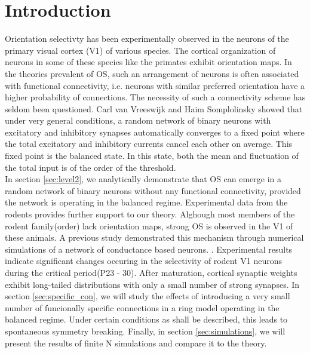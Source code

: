 \section{\label{sec:level1}Introduction}
Orientation selectivty has been experimentally observed in the neurons of the primary visual cortex (V1) of various species. The cortical organization of neurons in some of these species like the primates exhibit orientation maps. In the theories prevalent of OS, such an arrangement of neurons is often associated with functional connectivity, i.e. neurons with similar preferred orientation have a higher probability of connections. The necessity of such a connectivity scheme has seldom been questioned\@. 
Carl van Vreeswijk and Haim Somplolinsky \cite{} showed that  under very general conditions, a random network of binary neurons with excitatory and inhibitory synapses automatically converges to a fixed point where the total excitatory and inhibitory currents cancel each other on average. This fixed point is the balanced state. In this state, both the mean and fluctuation of the total input is of the order of the threshold\@. \\
In section \ref{sec:level2}, we analytically demonstrate that OS can emerge in a random network of binary neurons without any functional connectivity, provided the network is operating in the balanced regime. Experimental data from the rodents provides further support to our theory. Alghough most members of the rodent family(order) lack orientation maps, strong OS is observed in the V1 of these animals. A previous study demonstrated this mechanism through numerical simulations of a network of conductance based neurons. \cite{}\@. 
Experimental results indicate significant changes occuring in the selectivity of rodent V1 neurons during the critical period(P23 - 30). After maturation, cortical synaptic weights exhibit long-tailed distributions with only a small number of strong synapses. In section \ref{sec:specific_con}, we will study the effects of introducing a very small number of funcionally specific connections in a ring model operating in the balanced regime. Under certain conditions as shall be described, this leads to spontaneous symmetry breaking. Finally, in section \ref{sec:simulations}, we will present the results of finite N simulations and compare it to the theory. 
 
